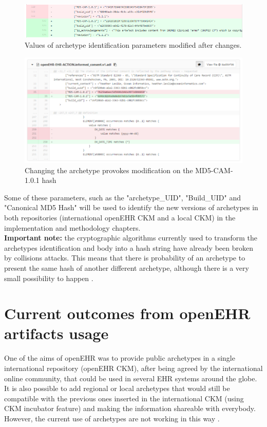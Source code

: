 \documentclass[mim_thesis.tex]{subfiles}
\begin{document}
\begin{figure}[H]
	\centering
  \includegraphics[width=1\textwidth]{img/compare_arch_versions.PNG}
	\caption{Values of archetype identification parameters modified after changes.}
	\label{fig:compare_arch_versions.PNG}
\end{figure}

\begin{figure}[H]
	\centering
  \includegraphics[width=1\textwidth]{img/MD5_hash_diff.PNG}
	\caption{Changing the archetype provokes modification on the MD5-CAM-1.0.1 hash}
	\label{fig:MD5_hash_diff}
\end{figure}

Some of these parameters, such as the "archetype\_UID", "Build\_UID" and "Canonical MD5 Hash" will be used to identify the new versions of archetypes in both repositories (international openEHR CKM and a local CKM) in the implementation and methodology chapters.\\


\textbf{Important note:} the cryptographic algorithms currently used to transform the archetypes identification and body into a hash string have already been broken by collisions attacks. This means that there is probability of an archetype to present the same hash of another different archetype, although there is a very small possibility to happen \citep{Selinger2006}.


\section{Current outcomes from openEHR artifacts usage}
One of the aims of openEHR was to provide public archetypes in a single 
international repository (openEHR CKM), after being agreed by the international 
online community, that could be used in several EHR systems around the globe. It 
is also possible to add regional or local archetypes that would still be compatible with the previous ones inserted in the international CKM (using CKM incubator feature) and making the information shareable with everybody. However, the current use of archetypes are not working in this way \citep{Grieve2016vid}.\\
\end{document}
